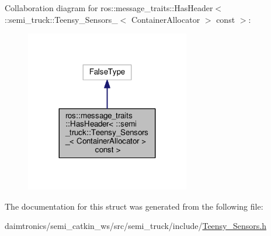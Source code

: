 Collaboration diagram for ros\+:\+:message\+\_\+traits\+:\+:Has\+Header$<$ \+:\+:semi\+\_\+truck\+:\+:Teensy\+\_\+\+Sensors\+\_\+$<$ Container\+Allocator $>$ const $>$\+:\nopagebreak
\begin{figure}[H]
\begin{center}
\leavevmode
\includegraphics[width=203pt]{structros_1_1message__traits_1_1_has_header_3_01_1_1semi__truck_1_1_teensy___sensors___3_01_cont1388c6e356159dc778a6603983922885}
\end{center}
\end{figure}


The documentation for this struct was generated from the following file\+:\begin{DoxyCompactItemize}
\item 
daimtronics/semi\+\_\+catkin\+\_\+ws/src/semi\+\_\+truck/include/\hyperlink{_teensy___sensors_8h}{Teensy\+\_\+\+Sensors.\+h}\end{DoxyCompactItemize}
